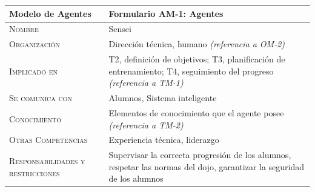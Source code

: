 \documentclass[12pt,a4paper,twoside,spanish]{article}      %
\begin{document}

        \begin{table}[H]
            \scriptsize
            \begin{tabularx}{\textwidth}{|l|X|} \hline
                \textbf{Modelo de Agentes} & \textbf{Formulario AM-1: Agentes} \\ \hline\hline
                
                \textsc{Nombre} &  Sensei \\ \hline
                
                \textsc{Organización} &  Dirección técnica, humano \emph{(referencia a OM-2)}\\ \hline
                
                \textsc{Implicado en} & T2, definición de objetivos; T3, planificación de entrenamiento; T4, seguimiento del progreso \emph{(referencia a TM-1)} \\ \hline
                
                \textsc{Se comunica con} &  Alumnos, Sistema inteligente  \\ \hline
                
                \textsc{Conocimiento} &  Elementos de conocimiento que el agente posee \emph{(referencia a TM-2)} \\ \hline
                
                \textsc{Otras Competencias} &  Experiencia técnica, liderazgo \\ \hline
                
                \textsc{Responsabilidades y restricciones} &  Supervisar la correcta progresión de los alumnos, respetar las normas del dojo, garantizar la seguridad de los alumnos\\ \hline
            \end{tabularx}
             \label{tab.AM1}
        \end{table}
        

        \pagebreak


\end{document}
